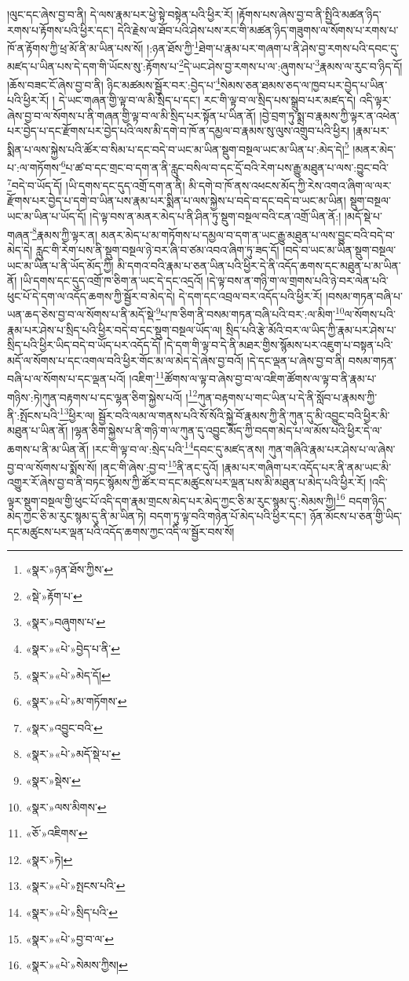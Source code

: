 །ལུང་དང་ཞེས་བྱ་བ་ནི། དེ་ལས་རྣམ་པར་ཕྱེ་སྟེ་བསྟེན་པའི་ཕྱིར་རོ། །རྟོགས་པས་ཞེས་བྱ་བ་ནི་སྤྱིའི་མཚན་ཉིད་རགས་པ་རྟོགས་པའི་ཕྱིར་དང་། དེའི་རྗེས་ལ་ཐོབ་པའི་ཤེས་པས་རང་གི་མཚན་ཉིད་གཟུགས་ལ་སོགས་པ་རགས་པ་ཁོ་ན་རྟོགས་ཀྱི་ཕྲ་མོ་ནི་མ་ཡིན་པས་སོ། །:ཉན་ཐོས་ཀྱི་\footnote{«སྣར་»ཉན་ཐོས་ཀྱིས་}ཐེག་པ་རྣམ་པར་གཞག་པ་ནི་ཤེས་བྱ་རགས་པའི་དབང་དུ་མཛད་པ་ཡིན་པས་དེ་དག་གི་ཡོངས་སུ་:རྟོགས་པ་\footnote{«སྡེ་»རྟོག་པ་}དེ་ཡང་ཤེས་བྱ་རགས་པ་ལ་:ཞུགས་པ་\footnote{«སྣར་»བཞུགས་པ་}རྣམས་ལ་རུང་བ་ཉིད་དོ། །ཆོས་བཟང་ངོ་ཞེས་བྱ་བ་ནི། ཉིང་མཚམས་སྦྱོར་བར་:བྱེད་པ་\footnote{«སྣར་»«པེ་»བྱེད་པ་ནི་}སེམས་ཅན་ཐམས་ཅད་ལ་ཁྱབ་པར་བྱེད་པ་ཡིན་པའི་ཕྱིར་རོ། །
དེ་ཡང་གཞན་གྱི་ལྟ་བ་ལ་མི་སྲིད་པ་དང་། རང་གི་ལྟ་བ་ལ་སྲིད་པས་སྒྲུབ་པར་མཛད་དེ། འདི་ལྟར་ཞེས་བྱ་བ་ལ་སོགས་པ་ནི་གཞན་གྱི་ལྟ་བ་ལ་མི་སྲིད་པར་སྟོན་པ་ཡིན་ནོ། །བྱེ་བྲག་ཏུ་སྨྲ་བ་རྣམས་ཀྱི་ལྟར་ན་འཕེན་པར་བྱེད་པ་དང་རྫོགས་པར་བྱེད་པའི་ལས་མི་དགེ་བ་ཁོ་ན་དམྱལ་བ་རྣམས་སུ་ལུས་འགྲུབ་པའི་ཕྱིར། །རྣམ་པར་སྨིན་པ་ལས་སྐྱེས་པའི་ཚོར་བ་སིམ་པ་དང་བདེ་བ་ཡང་མ་ཡིན་སྡུག་བསྔལ་ཡང་མ་ཡིན་པ་:མེད་དེ།\footnote{«སྣར་»«པེ་»མེད་དོ།} །མནར་མེད་པ་:ལ་གཏོགས་\footnote{«སྣར་»«པེ་»མ་གཏོགས་}པ་ཚ་བ་དང་གྲང་བ་དག་ན་ནི་རླུང་བསིལ་བ་དང་དྲོ་བའི་རེག་པས་རྒྱུ་མཐུན་པ་ལས་:བྱུང་བའི་\footnote{«སྣར་»འབྱུང་བའི་}བདེ་བ་ཡོད་དོ། །ཡི་དགས་དང་དུད་འགྲོ་དག་ན་ནི། མི་དགེ་བ་ཁོ་ནས་འཕངས་མོད་ཀྱི་རེས་འགའ་ཞིག་ལ་ལར་རྫོགས་པར་བྱེད་པ་དགེ་བ་ཡིན་པས་རྣམ་པར་སྨིན་པ་ལས་སྐྱེས་པ་བདེ་བ་དང་བདེ་བ་ཡང་མ་ཡིན། སྡུག་བསྔལ་ཡང་མ་ཡིན་པ་ཡོད་དོ། །དེ་ལྟ་བས་ན་མནར་མེད་པ་ནི་ཤིན་ཏུ་སྡུག་བསྔལ་བའི་ངན་འགྲོ་ཡིན་ནོ:། །མདོ་སྡེ་པ་གཞན་\footnote{«སྣར་»«པེ་»མདོ་སྡེ་པ་}རྣམས་ཀྱི་ལྟར་ན། མནར་མེད་པ་མ་གཏོགས་པ་དམྱལ་བ་དག་ན་ཡང་རྒྱུ་མཐུན་པ་ལས་བྱུང་བའི་བདེ་བ་མེད་དེ། རླུང་གི་རེག་པས་ནི་སྡུག་བསྔལ་ཉེ་བར་ཞི་བ་ཙམ་འབའ་ཞིག་ཏུ་ཟད་དོ། །བདེ་བ་ཡང་མ་ཡིན་སྡུག་བསྔལ་ཡང་མ་ཡིན་པ་ནི་ཡོད་མོད་ཀྱི། མི་དགའ་བའི་རྣམ་པ་ཅན་ཡིན་པའི་ཕྱིར་དེ་ནི་འདོད་ཆགས་དང་མཐུན་པ་མ་ཡིན་ནོ། །ཡི་དགས་དང་དུད་འགྲོ་ཁ་ཅིག་ན་ཡང་དེ་དང་འདྲའོ། །དེ་ལྟ་བས་ན་གཉི་ག་ལ་གྲགས་པའི་ཉེ་བར་ལེན་པའི་ཕུང་པོ་དེ་དག་ལ་འདོད་ཆགས་ཀྱི་སྦྱོར་བ་མེད་དེ། དེ་དག་དང་འབྲལ་བར་འདོད་པའི་ཕྱིར་རོ། །བསམ་གཏན་བཞི་པ་ཡན་ཆད་ཅེས་བྱ་བ་ལ་སོགས་པ་ནི་མདོ་སྡེ་\footnote{«སྣར་»སྡེས་}པ་ཁ་ཅིག་ནི་བསམ་གཏན་བཞི་པའི་བར་:ལ་མིག་\footnote{«སྣར་»ལས་མིགས་}ལ་སོགས་པའི་རྣམ་པར་ཤེས་པ་སྲིད་པའི་ཕྱིར་བདེ་བ་དང་སྡུག་བསྔལ་ཡོད་ལ། སྲིད་པའི་རྩེ་མོའི་བར་ལ་ཡིད་ཀྱི་རྣམ་པར་ཤེས་པ་སྲིད་པའི་ཕྱིར་ཡིད་བདེ་བ་ཡོད་པར་འདོད་དོ། །དེ་དག་གི་ལྟ་བ་དེ་ནི་མཐར་གྱིས་སྙོམས་པར་འཇུག་པ་བསྟན་པའི་མདོ་ལ་སོགས་པ་དང་འགལ་བའི་ཕྱིར་གོང་མ་ལ་མེད་དེ་ཞེས་བྱ་བའོ། །དེ་དང་ལྡན་པ་ཞེས་བྱ་བ་ནི། བསམ་གཏན་བཞི་པ་ལ་སོགས་པ་དང་ལྡན་པའོ། །འཇིག་\footnote{«ཅོ་»འཇིགས་}ཚོགས་ལ་ལྟ་བ་ཞེས་བྱ་བ་ལ་འཇིག་ཚོགས་ལ་ལྟ་བ་ནི་རྣམ་པ་གཉིས་:ཏེ།ཀུན་བརྟགས་པ་དང་ལྷན་ཅིག་སྐྱེས་པའོ། །\footnote{«སྣར་»ཏེ།}ཀུན་བརྟགས་པ་གང་ཡིན་པ་དེ་ནི་སློབ་པ་རྣམས་ཀྱི་ནི་:སྤོངས་པའི་\footnote{«སྣར་»«པེ་»སྤངས་པའི་}ཕྱིར་ལ། སྦྱོར་བའི་ལམ་ལ་གནས་པའི་སོ་སོའི་སྐྱེ་བོ་རྣམས་ཀྱི་ནི་ཀུན་དུ་མི་འབྱུང་བའི་ཕྱིར་མི་མཐུན་པ་ཡིན་ནོ། །ལྷན་ཅིག་སྐྱེས་པ་ནི་གཉི་ག་ལ་ཀུན་དུ་འབྱུང་མོད་ཀྱི་བདག་མེད་པ་ལ་མོས་པའི་ཕྱིར་དེ་ལ་ཆགས་པ་ནི་མ་ཡིན་ནོ། །རང་གི་ལྟ་བ་ལ་:སྲེད་པའི་\footnote{«སྣར་»«པེ་»སྲིད་པའི་}དབང་དུ་མཛད་ནས། ཀུན་གཞིའི་རྣམ་པར་ཤེས་པ་ལ་ཞེས་བྱ་བ་ལ་སོགས་པ་སྨོས་སོ། །ནང་གི་ཞེས་:བྱ་བ་\footnote{«སྣར་»«པེ་»བྱ་བ་ལ་}ནི་ནང་དུའོ། །རྣམ་པར་གཞིག་པར་འདོད་པར་ནི་ནམ་ཡང་མི་འགྱུར་རོ་ཞེས་བྱ་བ་ནི་བཏང་སྙོམས་ཀྱི་ཚོར་བ་དང་མཚུངས་པར་ལྡན་པས་མི་མཐུན་པ་མེད་པའི་ཕྱིར་རོ། །འདི་ལྟར་སྡུག་བསྔལ་གྱི་ཕུང་པོ་འདི་དག་རྣམ་གྲངས་མེད་པར་མེད་ཀྱང་ཅི་མ་རུང་སྙམ་དུ་:སེམས་ཀྱི།\footnote{«སྣར་»«པེ་»སེམས་ཀྱིས།} བདག་ཉིད་མེད་ཀྱང་ཅི་མ་རུང་སྙམ་དུ་ནི་མ་ཡིན་ཏེ། བདག་ཏུ་ལྟ་བའི་གཉེན་པོ་མེད་པའི་ཕྱིར་དང་། ཉོན་མོངས་པ་ཅན་གྱི་ཡིད་དང་མཚུངས་པར་ལྡན་པའི་འདོད་ཆགས་ཀྱང་འདི་ལ་སྦྱོར་བས་སོ། 